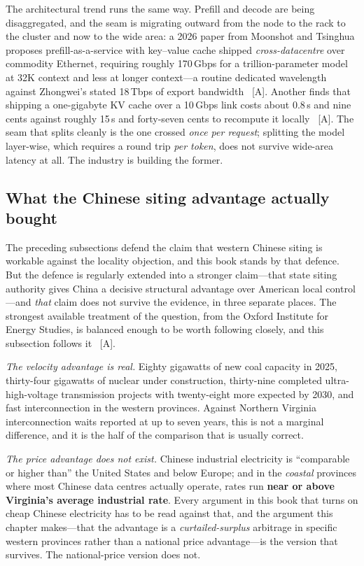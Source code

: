 The architectural trend runs the same way. Prefill and decode are being disaggregated, and the seam is migrating outward from the node to the rack to the cluster and now to the wide area: a 2026 paper from Moonshot and Tsinghua proposes prefill-as-a-service with key--value cache shipped \emph{cross-datacentre} over commodity Ethernet, requiring roughly 170\,Gbps for a trillion-parameter model at 32K context and less at longer context---a routine dedicated wavelength against Zhongwei's stated 18\,Tbps of export bandwidth~\cite{prefill-service} [A]. Another finds that shipping a one-gigabyte KV cache over a 10\,Gbps link costs about 0.8\,s and nine cents against roughly 15\,s and forty-seven cents to recompute it locally~\cite{kv-internet} [A]. The seam that splits cleanly is the one crossed \emph{once per request}; splitting the model layer-wise, which requires a round trip \emph{per token}, does not survive wide-area latency at all. The industry is building the former.

\subsection{What the Chinese siting advantage actually bought}
\label{sec:china-siting-cost}

The preceding subsections defend the claim that western Chinese siting is workable against the locality objection, and this book stands by that defence. But the defence is regularly extended into a stronger claim---that state siting authority gives China a decisive structural advantage over American local control---and \emph{that} claim does not survive the evidence, in three separate places. The strongest available treatment of the question, from the Oxford Institute for Energy Studies, is balanced enough to be worth following closely, and this subsection follows it~\cite{china-dc-utilization} [A].

\emph{The velocity advantage is real.} Eighty gigawatts of new coal capacity in 2025, thirty-four gigawatts of nuclear under construction, thirty-nine completed ultra-high-voltage transmission projects with twenty-eight more expected by 2030, and fast interconnection in the western provinces. Against Northern Virginia interconnection waits reported at up to seven years, this is not a marginal difference, and it is the half of the comparison that is usually correct.

\emph{The price advantage does not exist.} Chinese industrial electricity is ``comparable or higher than'' the United States and below Europe; and in the \emph{coastal} provinces where most Chinese data centres actually operate, rates run \textbf{near or above Virginia's average industrial rate}. Every argument in this book that turns on cheap Chinese electricity has to be read against that, and the argument this chapter makes---that the advantage is a \emph{curtailed-surplus} arbitrage in specific western provinces rather than a national price advantage---is the version that survives. The national-price version does not.

